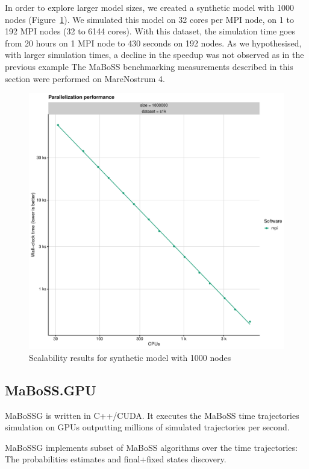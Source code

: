 \documentclass[times, twoside]{zHenriquesLab-StyleBioRxiv}
\begin{document}
In order to explore larger model sizes, we created a synthetic model with 1000 nodes (Figure~\ref{fig:synthetic_results}). We simulated this model on 32 cores per MPI node, on 1 to 192 MPI nodes (32 to 6144 cores). With this dataset, the simulation time goes from 20 hours on 1 MPI node to 430 seconds on 192 nodes. As we hypothesised, with larger simulation times, a decline in the speedup was not observed as in the previous example 
The MaBoSS benchmarking measurements described in this section were performed on MareNostrum 4.

\begin{figure}%
\centering
\includegraphics[width=.8\linewidth]{Figures/large_model.pdf}
\caption{Scalability results for synthetic model with 1000 nodes}
\label{fig:synthetic_results}
\end{figure}


\subsection*{MaBoSS.GPU}
MaBoSSG is written in C++/CUDA. It executes the MaBoSS time trajectories simulation on GPUs outputting millions of simulated trajectories per second. 

MaBoSSG implements subset of MaBoSS algorithms over the time trajectories: The probabilities estimates and final+fixed states discovery.

\end{document}
